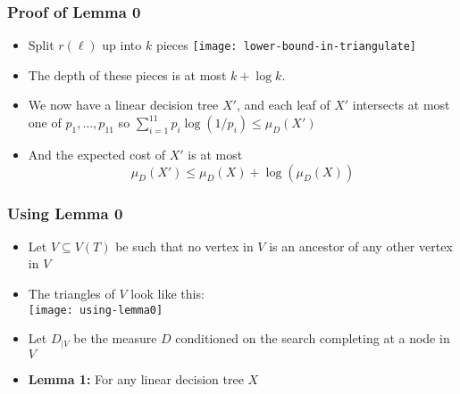 \documentclass{beamer}
\DeclareMathOperator{\support}{support}
\DeclareMathOperator{\boundary}{\partial}
\begin{document}
\frame
{
	\frametitle{Proof of Lemma 0}
        \begin{itemize}
	   \item<1-> Split $r(\ell)$ up into $k$ pieces 
           \texttt{[image: lower-bound-in-triangulate]}
	   \item<2-> The depth of these pieces is at most $k+\log k$.
           \item<3-> We now have a linear decision tree $X'$, and each
leaf of $X'$ intersects at most one of $p_1,\ldots,p_{11}$ so
	     $ \sum_{i=1}^{11}p_i\log(1/p_i) \le \mu_D(X') $
           \item<4-> And the expected 
cost of $X'$ is at most 
	\[ \mu_D(X') \le \mu_D(X) + \log(\mu_D(X)) \]
        \end{itemize}
}





%
%
%

\frame
{
    \frametitle{Using Lemma 0}
    \begin{itemize}
	\item<1-> Let $V\subseteq V(T)$ be such that no vertex in
$V$ is an ancestor of any other vertex in $V$
        \item<2-> The triangles of $V$ look like this:\\
	\texttt{[image: using-lemma0]}
        \item<3->Let $D_{\mid V}$ be the measure $D$ conditioned on the
search completing at a node in $V$
        \item<4->\textbf{Lemma 1:} For any linear decision tree $X$

    \end{itemize}
}
\end{document}
